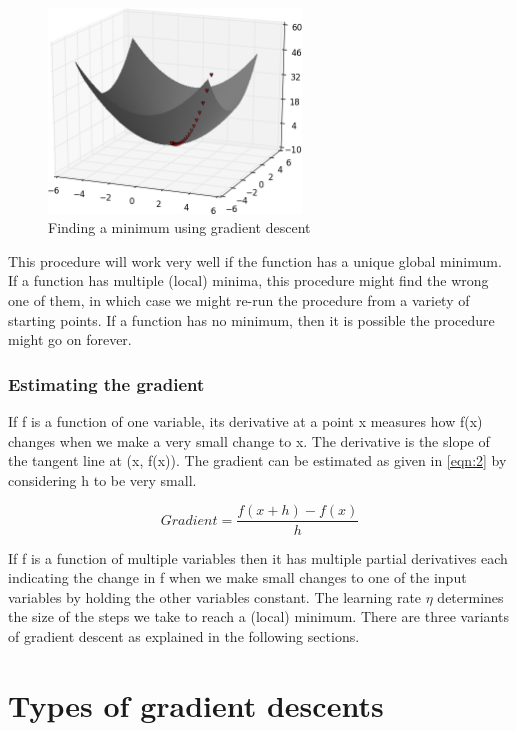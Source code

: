 \documentclass[a4paper, 12pt, oneside, BCOR1cm,toc=chapterentrywithdots]{scrbook}
\begin{document}
\begin{figure}[h]
\centering
\includegraphics[width=0.6\textwidth]{image1.png}
\caption{Finding a minimum using gradient descent}
\label{fig:pic0}
\end{figure}

This procedure will work very well if the function has a unique global minimum. If a function has multiple (local) minima, this procedure might find the wrong one of them, in which case we might re-run the procedure from a variety of starting points. If a function has no minimum, then it is possible the procedure might go on forever.

\subsubsection{Estimating the gradient}


If f is a function of one variable, its derivative at a point x measures how f(x) changes when we make a very small change to x. The derivative is the slope of the tangent line at (x, f(x)). The gradient can be estimated as given in \ref{eqn:2} by considering h to be very small.

\begin{equation} \label{eqn:2}
Gradient = \frac{f(x+h) - f(x)}{h}
\end{equation}

If f is a function of multiple variables then it has multiple partial derivatives each indicating the change in f when we make small changes to one of the input variables by holding the other variables constant. The learning rate $\eta$ determines the size of the steps we take to reach a (local) minimum. There are three variants of gradient descent as explained in the following sections.

\section{Types of gradient descents }
\end{document}
